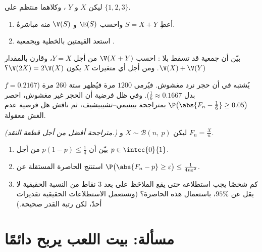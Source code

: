 \begin{exercise}[$\star\star$]\label{exo:g12:sums:5}
ليكن $X$ و $Y$ ، وكلاهما منتظم على $\{1, 2, 3\}$.
\begin{enumerate}
  \item أعطِ  $S = X + Y$ واحسب $\E(S)$ و $\V(S)$
        منه مباشرةً.
  \item استعد القيمتين بالخطية وبجمعية .
\end{enumerate}
\end{exercise}

\begin{exercise}[$\star\star$]\label{exo:g12:sums:6}
بيّن أن جمعية  قد تسقط بلا :
احسب $\V(X + Y)$ من أجل $Y = X$، وقارن بالمقدار $\V(X) + \V(Y)$. ومن أجل
أي متغيرات $X$ يكون $\V(2X) = 2\V(X)$؟
\end{exercise}

\begin{exercise}[$\star\star$]\label{exo:g12:sums:7}
يُشتبه في أن حجر نرد مغشوش. فيُرمى $1200$ مرة فيُظهر
ستة $260$ مرة ($f = 0.2167$ بدل $\frac16 \approx 0.1667$). وفي ظل
فرضية أن الحجر غير مغشوش، احصر
$\P\bigl(\abs{F_n - \frac16} \geq 0.05\bigr)$ بمتراجحة بيينيمي--تشيبيشيف، ثم
ناقش هل فرضية عدم الغش معقولة.
\end{exercise}

\begin{exercise}[$\star\star\star$]\label{exo:g12:sums:8}
\emph{(متراجحة أفضل من أجل قطعة النقد.)} ليكن
$X \sim \mathcal B(n,\ p)$ و $F_n = \frac Xn$.
\begin{enumerate}
  \item بيّن أن $p(1-p) \leq \frac14$ من أجل $p \in \intcc{0}{1}$.
  \item استنتج الحاصرة المستقلة عن 
        $\P\bigl(\abs{F_n - p} \geq \varepsilon\bigr) \leq
        \frac{1}{4n\varepsilon^2}$.
  \item كم شخصًا يجب استطلاعه حتى يقع  الملاحَظ
        على بعد $3$ نقاط من النسبة الحقيقية  لا يقل عن
        $95\%$، باستعمال هذه الحاصرة؟ (وتستعمل الاستطلاعات الحقيقية تقديرات أحدّ، لكن
        رتبة القدر صحيحة.)
\end{enumerate}
\end{exercise}

\section{مسألة: بيت اللعب يربح دائمًا}

